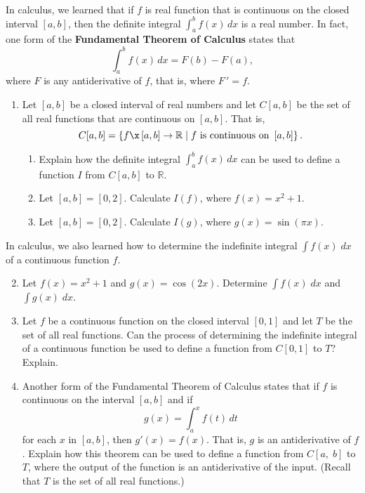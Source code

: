 \begin{activity} \label{A:integration} \hfill \\
In calculus, we learned that if  $f$  is real function that is continuous on the closed interval  $\left[ {a, b} \right]$, then the definite integral  $\int_a^b {f( x ) \, dx} $ is a real number.  In fact, one form of the \textbf{Fundamental Theorem of Calculus}
%
 states that
\[
\int_a^b {f( x ) \, dx} = F( b ) - F( a ),
\]
where  $F$  is any antiderivative of  $f$, that is, where  $F \,' = f$\!.
%
\begin{enumerate}
\item Let  $\left[ {a, b} \right]$ be a closed interval of real numbers and let  
$C {\left[ {a, b} \right]} $ be the set of all real functions that are continuous on  
$\left[ {a, b} \right]$.  That is,
\[
C{\left[ {a, b} \right]}  = \left\{ {f\x \left[ {a, b} \right] \to \mathbb{R}  \mid f\text{ is continuous on }\left[ {a, b} \right]} \right\}.
\]
%
\begin{enumerate}
\item Explain how the definite integral   $\int_a^b {f( x ) \, dx} $  can be used to define a function  $I$  from  $C{\left[ {a, b} \right]} $ to  $\mathbb{R}$.

\item Let  $\left[ {a, b} \right] = \left[ {0, 2} \right]$.  Calculate  $I( f )$,
  where  $f( x ) = x^2  + 1$.

\item Let  $\left[ {a, b} \right] = \left[ {0, 2} \right]$.  Calculate  $I( g )$,
  where  $g( x ) = \sin ( {\pi x} )$.
\end{enumerate}
%
\end{enumerate}
%
In calculus, we also learned how to determine the indefinite integral  
$\int {f( x )} \;dx$ of a continuous function  $f$.

\begin{enumerate}
\setcounter{enumi}{1}
\item Let  $f( x ) = x^2  + 1$ and $g(x) = \cos( 2x )$. Determine  
$\int {f( x )} \;dx$ and $\int {g( x )} \;dx$.

\item Let  $f$  be a continuous function on the closed interval  $\left[ {0, 1} \right]$
  and let  $T$  be the set of all real functions.  Can the process of determining the indefinite integral of a continuous function be used to define a function from $C{\left[ {0, 1} \right]}$ to  $T$?  Explain.

\item Another form of the Fundamental Theorem of Calculus states that if  $f$  is continuous on the interval  $\left[ {a, b} \right]$ and if  
\[
g( x ) = \int_a^x {f( t ) \, dt}
\]
for each  $x$  in  $\left[ {a, b} \right]$, then  $g'\left( x \right) = f\left( x \right)$.  That is,  $g$  is an antiderivative of  $f$.  Explain how this theorem can be used to define a function from $C{\left[ {a,\;b} \right]} $ to  $T$\!,   where the output of the function is an antiderivative of the input.  (Recall that  $T$  is the set of all real functions.)

\end{enumerate}
\end{activity}
